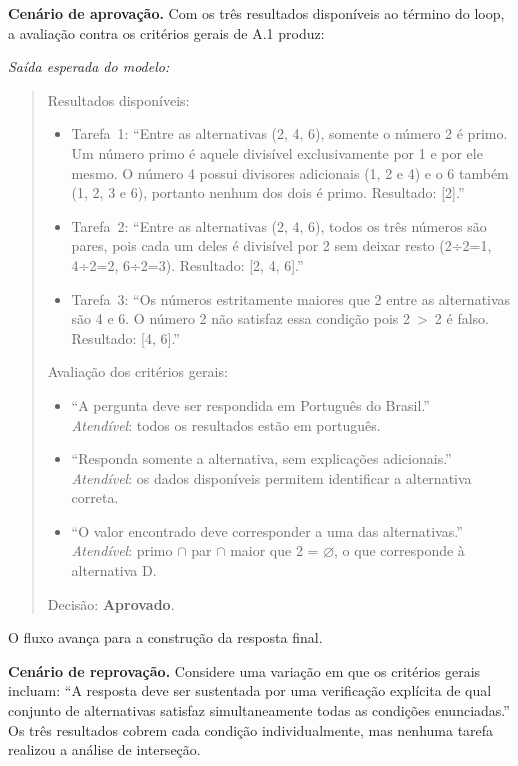 \documentclass[a4paper,10pt,twocolumn]{article}
\newcommand{\saidaLLM}{%
  \smallskip\noindent\textit{Saída esperada do modelo:}\smallskip\par
}
\begin{document}
\begin{exemplo}
\textbf{Cenário de aprovação.} Com os três resultados disponíveis ao término do loop, a avaliação contra os critérios gerais de A.1 produz:

\saidaLLM

\begin{quote}
Resultados disponíveis:
\begin{itemize}
  \item Tarefa~1: ``Entre as alternativas (2, 4, 6), somente o número 2 é primo. Um número primo é aquele divisível exclusivamente por 1 e por ele mesmo. O número 4 possui divisores adicionais (1, 2 e 4) e o 6 também (1, 2, 3 e 6), portanto nenhum dos dois é primo. Resultado: [2].''
  \item Tarefa~2: ``Entre as alternativas (2, 4, 6), todos os três números são pares, pois cada um deles é divisível por 2 sem deixar resto (2÷2=1, 4÷2=2, 6÷2=3). Resultado: [2, 4, 6].''
  \item Tarefa~3: ``Os números estritamente maiores que 2 entre as alternativas são 4 e 6. O número 2 não satisfaz essa condição pois 2~>~2 é falso. Resultado: [4, 6].''
\end{itemize}

Avaliação dos critérios gerais:
\begin{itemize}
  \item ``A pergunta deve ser respondida em Português do Brasil.'' \\ \textit{Atendível}: todos os resultados estão em português.
  \item ``Responda somente a alternativa, sem explicações adicionais.'' \\ \textit{Atendível}: os dados disponíveis permitem identificar a alternativa correta.
  \item ``O valor encontrado deve corresponder a uma das alternativas.'' \\ \textit{Atendível}: primo $\cap$ par $\cap$ maior que 2 = $\varnothing$, o que corresponde à alternativa D.
\end{itemize}
Decisão: \textbf{Aprovado}.
\end{quote}

O fluxo avança para a construção da resposta final.

\bigskip
\textbf{Cenário de reprovação.} Considere uma variação em que os critérios gerais incluam: ``A resposta deve ser sustentada por uma verificação explícita de qual conjunto de alternativas satisfaz simultaneamente todas as condições enunciadas.'' Os três resultados cobrem cada condição individualmente, mas nenhuma tarefa realizou a análise de interseção.


\end{exemplo}
\end{document}
